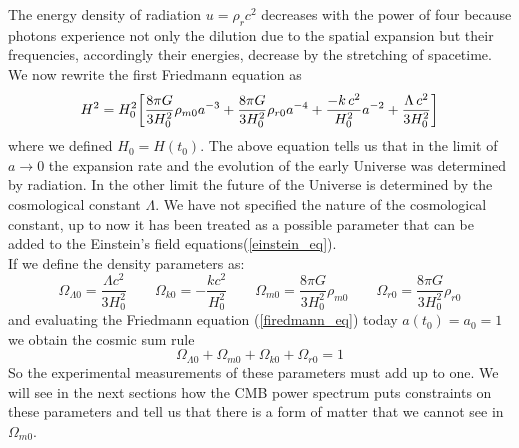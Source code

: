 \documentclass{article}
\newcommand{\beq}{\begin{equation}}
\newcommand{\eeq}{\end{equation}}
\begin{document}
The energy density of radiation $u = \rho_r c^2 $ decreases with the power of four because photons experience not only the dilution due to the spatial expansion but their frequencies, accordingly their energies, decrease by the stretching of spacetime.\\
We now rewrite the first Friedmann equation as
\begin{equation}
H ^2 = H_0 ^2 \qty[
\dfrac{8 \pi G}{3 H_0 ^2} \rho_{m 0} a^{-3}+
\dfrac{8 \pi G}{3 H_0 ^2} \rho_{r 0} a^{-4}+ 
\dfrac{-k \, c^2}{H_0 ^2} a^{-2} + \dfrac{\Lambda \, c^2}{3 H_0 ^2}
] \notag
\end{equation}
where we defined $H_0 = H(t_0)$.
The above equation tells us that in the limit of $a \rightarrow 0$ the expansion rate and the evolution of the early Universe was determined by radiation.
In the other limit the future of the Universe is determined by the cosmological constant $\Lambda$.
We have not specified the nature of the cosmological constant, up to now it has been treated as a possible parameter that can be added to the Einstein's field equations(\ref{einstein_eq}).
\\
If we define the density parameters as:
\beq
\Omega_{\Lambda 0} = \dfrac{\Lambda c^2}{3 H_0 ^2} \qquad \Omega_{k0} = -  \dfrac{k c^2}{H_0 ^2} \qquad
\Omega_{m0} = \dfrac{8 \pi G}{3 H_0 ^2} \rho_{m 0} \qquad \Omega_{r0} =\dfrac{8 \pi G}{3 H_0 ^2} \rho_{r 0}
\eeq
 and evaluating the Friedmann equation (\ref{firedmann_eq}) today $a(t_0) =a_0 =1$ we obtain the cosmic sum rule
\begin{equation}
\label{cosmic_rule}
\Omega_{\Lambda 0} + \Omega_{m 0} + \Omega_{k 0} + \Omega_{r 0} = 1
\end{equation}
So the experimental measurements of these parameters must add up to one.
We will see in the next sections how the CMB power spectrum puts constraints on these parameters and tell us that there is a form of matter that we cannot see in $\Omega_{m0}$.
\end{document}
